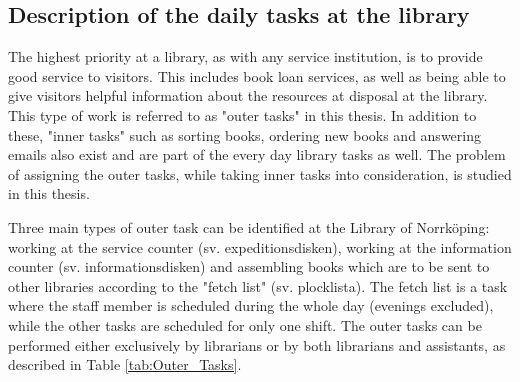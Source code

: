 \subsection{Description of the daily tasks at the library} \label{section:library_tasks}
The highest priority at a library, as with any service institution, is to provide good service to visitors. This includes book loan services, as well as being able to give visitors helpful information about the resources at disposal at the library. This type of work is referred to as "outer tasks" in this thesis. In addition to these, "inner tasks" such as sorting books, ordering new books and answering emails also exist and are part of the every day library tasks as well. The problem of assigning the outer tasks, while taking inner tasks into consideration, is studied in this thesis.

Three main types of outer task can be identified at the Library of Norrköping: working at the service counter (sv. expeditionsdisken), working at the information counter (sv. informationsdisken) and assembling books which are to be sent to other libraries according to the "fetch list" (sv. plocklista). The fetch list is a task where the staff member is scheduled during the whole day (evenings excluded), while the other tasks are scheduled for only one shift. The outer tasks can be performed either exclusively by librarians or by both librarians and assistants, as described in Table \ref{tab:Outer_Tasks}.

